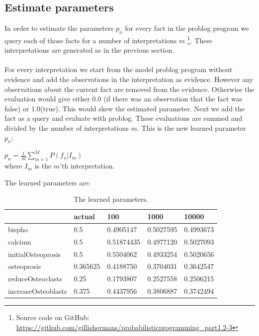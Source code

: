 \documentclass{article}
\begin{document}
\subsection{Estimate parameters}
In order to estimate the parameters $p_{n}$ for every fact in the problog program we query each of those facts for a number of interpretations $m$ \footnote{Source code on GitHub: \href{https://github.com/gillishermans/probabilisticprogramming_part1.2-3}{https://github.com/gillishermans/probabilisticprogramming\_part1.2-3}}. These interpretations are generated as in the previous section.\\\\
For every interpretation we start from the model problog program without evidence and add the observations in the interpretation as evidence. However any observations about the current fact are removed from the evidence. Otherwise the evaluation would give either 0.0 (if there was an observation that the fact was false) or 1.0(true). This would skew the estimated parameter. Next we add the fact as a query and evaluate with problog. These evaluations are summed and divided by the number of interpretations $m$. This is the new learned parameter $p_{n}$:
\begin{center}
    $p_{n} = \frac{1}{M} \sum_{m=1}^M P(f_{n}|I_{m}) $\\
    where $I_{m}$ is the $m$'th interpretation.
\end{center}
The learned parameters are:
\begin{table}[h!]
    \begin{center}
    \begin{tabular}{|l|l|l|l|l|}
    \hline
                    & actual   & 100        & 1000      & 10000     \\ \hline
    bispho              & 0.5      & 0.4905147  & 0.5027595 & 0.4993673 \\ \hline
    calcium             & 0.5      & 0.51874435 & 0.4977120 & 0.5027093 \\ \hline
    initialOsteoprosis  & 0.5      & 0.5504062  & 0.4933254 & 0.5020656 \\ \hline
    osteoprosis         & 0.365625 & 0.4188750  & 0.3704031 & 0.3642547 \\ \hline
    reduceOsteoclasts   & 0.25     & 0.1793807  & 0.2527558 & 0.2506215 \\ \hline
    increaseOsteoblasts & 0.375    & 0.4437956  & 0.3806887 & 0.3742494          \\ \hline
    \end{tabular}
    \caption{The learned parameters.}
    \label{tab:param}
    \end{center}
\end{table}
\end{document}
